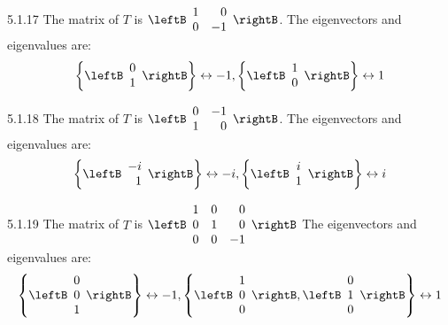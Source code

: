 \begin{Answer}{5.1.17}
The matrix of $T$ is $\leftB
\begin{array}{rr}
1 & 0 \\
0 & -1
\end{array}
\rightB$. The eigenvectors and eigenvalues are:
\[
\left\{ \leftB
\begin{array}{c}
0 \\
1
\end{array}
\rightB \right\} \leftrightarrow -1,\left\{ \leftB
\begin{array}{c}
1 \\
0
\end{array}
\rightB \right\} \leftrightarrow 1
\]
\end{Answer}
\begin{Answer}{5.1.18}
The matrix of $T$ is $\leftB
\begin{array}{rr}
0 & -1 \\
1 & 0
\end{array}
\rightB$. The eigenvectors and eigenvalues are:
\[
\left\{ \leftB
\begin{array}{r}
-i \\
1
\end{array}
\rightB \right\} \leftrightarrow -i,\left\{ \leftB
\begin{array}{c}
i \\
1
\end{array}
\rightB \right\} \leftrightarrow i
\]
\end{Answer}
\begin{Answer}{5.1.19}
The matrix of $T$ is $\leftB
\begin{array}{rrr}
1 & 0 & 0 \\
0 & 1 & 0 \\
0 & 0 & -1
\end{array}
\rightB$
The eigenvectors and eigenvalues are:
\[
\left\{ \leftB
\begin{array}{c}
0 \\
0 \\
1
\end{array}
\rightB \right\} \leftrightarrow -1,\left\{ \leftB
\begin{array}{c}
1 \\
0 \\
0
\end{array}
\rightB ,\leftB
\begin{array}{c}
0 \\
1 \\
0
\end{array}
\rightB \right\} \leftrightarrow 1
\]
\end{Answer}
